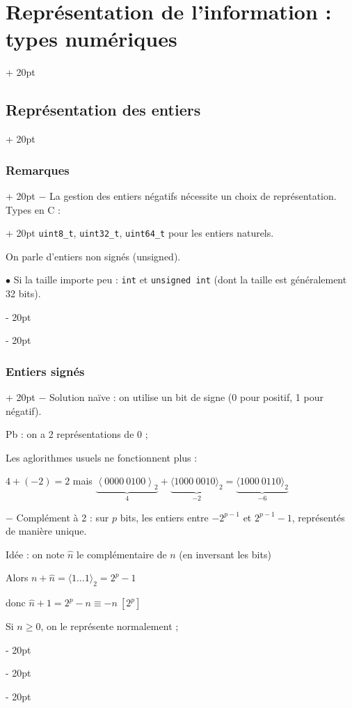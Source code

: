 \documentclass[a4paper, 12pt, twoside]{article}
\newcommand{\lrangle}[1]{\left\langle #1 \right\rangle}
\newcommand{\ind}[1][20pt]{\advance\leftskip + #1}
\newcommand{\deind}[1][20pt]{\advance\leftskip - #1}
\newenvironment{indentedenv}[1][20pt]{\par \ind[#1]}{\par \deind}
\newenvironment{indt}[2][20pt]{#2 \begin{indentedenv}[#1]}{\end{indentedenv}} %
\begin{document}
\begin{indt}{\section{Représentation de l'information : types numériques}}
\begin{indt}{\subsection{Représentation des entiers}}
\begin{indt}{\subsubsection{Remarques}}
\begin{indt}{$-$ La gestion des entiers négatifs nécessite un choix de représentation. Types en C :}
                    \texttt{uint8\_t}, \texttt{uint32\_t}, \texttt{uint64\_t} pour les entiers naturels.
                    
                    On parle d'entiers non signés (unsigned).
                    
                    \vspace{6pt}
                    
                    $\bullet$ Si la taille importe peu : \texttt{int} et \texttt{unsigned int} (dont la taille est généralement 32 bits).
                \end{indt}
            \end{indt}
            
            \vspace{12pt}
            
            \begin{indt}{\subsubsection{Entiers signés}}
                $-$ Solution naïve : on utilise un bit de signe (0 pour positif, 1 pour négatif).
                
                Pb : on a 2 représentations de 0 ;
                
                Les aglorithmes usuels ne fonctionnent plus :
                
                $4 + (-2) = 2$ mais $\underbrace{\lrangle{0000\ 0100}_2}_4 + \underbrace{\langle 1000\ 0010 \rangle_2}_{-2} = \underbrace{\langle 1000\ 0110 \rangle_2}_{-6} $
                
                \vspace{12pt}
                
                $-$ Complément à 2 : sur $p$ bits, les entiers entre $-2^{p - 1}$ et $2^{p - 1} - 1$, représentés de manière unique.
                
                Idée : on note $\hat n$ le complémentaire de $n$ (en inversant les bits)
                
                Alors $n + \hat n = \langle 1 \ldots 1 \rangle_2 = 2^p - 1$
                
                donc $\hat n + 1 = 2^p - n \equiv -n\ [2^p]$
                
                \vspace{6pt}
                
                Si $n \ge 0$, on le représente normalement ;
                

\end{indt}
\end{indt}
\end{indt}
\end{document}
